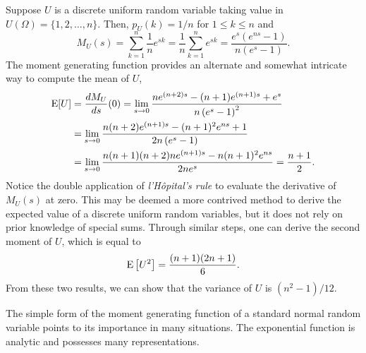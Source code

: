\begin{example}
Suppose $U$ is a discrete uniform random variable taking value in $U(\Omega) = \{ 1, 2, \ldots, n \}$.
Then, $p_U(k) = 1/n$ for $1 \leq k \leq n$ and
\begin{equation*}
M_U(s) = \sum_{k = 1}^n \frac{1}{n} e^{sk}
= \frac{1}{n} \sum_{k = 1}^n e^{sk}
= \frac {e^s (e^{ns} - 1)} {n (e^s - 1)} .
\end{equation*}
The moment generating function provides an alternate and somewhat intricate way to compute the mean of $U$,
\begin{equation*}
\begin{split}
\mathrm{E} [U] &= \frac{d M_U}{ds} (0)
= \lim_{s \rightarrow 0}
\frac{n e^{(n+2)s} - (n+1) e^{(n+1)s} + e^s}{n \left( e^s - 1 \right)^2} \\
&= \lim_{s \rightarrow 0}
\frac{n(n+2) e^{(n+1)s} - (n+1)^2 e^{ns} + 1}{2n \left( e^s - 1 \right)} \\
&= \lim_{s \rightarrow 0}
\frac{n(n+1)(n+2)n e^{(n+1)s} - n (n+1)^2 e^{ns}}{2n e^s}
= \frac {n + 1}{2} .
\end{split}
\end{equation*}
Notice the double application of \emph{l'H\^{o}pital's rule} to evaluate the derivative of $M_U(s)$ at zero.
This may be deemed a more contrived method to derive the expected value of a discrete uniform random variables, but it does not rely on prior knowledge of special sums.
Through similar steps, one can derive the second moment of $U$, which is equal to
\begin{equation*}
\mathrm{E} \left[ U^2 \right] = \frac{(n+1)(2n+1)}{6} .
\end{equation*}
From these two results, we can show that the variance of $U$ is $(n^2 - 1)/12$.
\end{example}

The simple form of the moment generating function of a standard normal random variable points to its importance in many situations.
The exponential function is analytic and possesses many representations.

